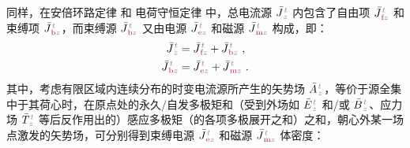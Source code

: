 同样，在安倍环路定律  和 电荷守恒定律  中，总电流源 $\bar{J}^{\;\!\mathcolor{gray}{t}}_{\;\!\mathcolor{gray}{z}}$ 内包含了自由项 $\bar{J}^{\;\!\mathcolor{gray}{t}}_{\;\!\textcolor{Maroon}{\text{f}}\mathcolor{gray}{z}}$ 和束缚项 $\bar{J}^{\;\!\mathcolor{gray}{t}}_{\;\!\textcolor{Maroon}{\text{b}}\mathcolor{gray}{z}}$\cite{langeMultipoleTheoryHehl2015,raabMultipoleTheoryElectromagnetism2004}，而束缚源 $\bar{J}^{\;\!\mathcolor{gray}{t}}_{\;\!\textcolor{Maroon}{\text{b}}\mathcolor{gray}{z}}$ 又由电源 $\bar{J}^{\;\!\mathcolor{gray}{t}}_{\;\!\textcolor{Maroon}{\text{e}}\mathcolor{gray}{z}}$ 和磁源 $\bar{J}^{\;\!\mathcolor{gray}{t}}_{\;\!\textcolor{Maroon}{\text{m}}\mathcolor{gray}{z}}$ 构成，即：
\begin{subequations} \label{eq:j-fbem}
	\abovedisplayskip=-2pt
\begin{align}
	\bar{J}^{\;\!\mathcolor{gray}{t}}_{\;\!\mathcolor{gray}{z}} &= \bar{J}^{\;\!\mathcolor{gray}{t}}_{\;\!\textcolor{Maroon}{\text{f}}\mathcolor{gray}{z}} + \bar{J}^{\;\!\mathcolor{gray}{t}}_{\;\!\textcolor{Maroon}{\text{b}}\mathcolor{gray}{z}}~, \label{eq:j=f+b} \\ \bar{J}^{\;\!\mathcolor{gray}{t}}_{\;\!\textcolor{Maroon}{\text{b}}\mathcolor{gray}{z}} &= \bar{J}^{\;\!\mathcolor{gray}{t}}_{\;\!\textcolor{Maroon}{\text{e}}\mathcolor{gray}{z}} + \bar{J}^{\;\!\mathcolor{gray}{t}}_{\;\!\textcolor{Maroon}{\text{m}}\mathcolor{gray}{z}}~. \label{eq:b=e+m}
\end{align}
\end{subequations}
其中，考虑有限区域内连续分布的时变电流源所产生的矢势场 $\bar{A}^{\;\!\mathcolor{gray}{t}}_{\;\!\mathcolor{gray}{z}}$，等价于源全集中于其荷心时，在原点处的永久/自发多极矩和（受到外场如 $\bar{E}^{\;\!\mathcolor{gray}{t}}_{\;\!\mathcolor{gray}{z}}$ 和/或 $\bar{B}^{\;\!\mathcolor{gray}{t}}_{\;\!\mathcolor{gray}{z}}$、应力场 $\bar{T}^{\;\!\mathcolor{gray}{t}}_{\;\!\mathcolor{gray}{z}}$ 等后反作用出的）感应多极矩（的各项多极展开之和）之和，朝心外某一场点激发的矢势场\cite{raabMultipoleTheoryElectromagnetism2004,delangeTranslationalInvariancePost2012,chen-zhuChenZhuxieUndergraduate_courses2024}，可分别得到束缚电源 $\bar{J}^{\;\!\mathcolor{gray}{t}}_{\;\!\textcolor{Maroon}{\text{e}}\mathcolor{gray}{z}}$ 和磁源 $\bar{J}^{\;\!\mathcolor{gray}{t}}_{\;\!\textcolor{Maroon}{\text{m}}\mathcolor{gray}{z}}$ 体密度：
